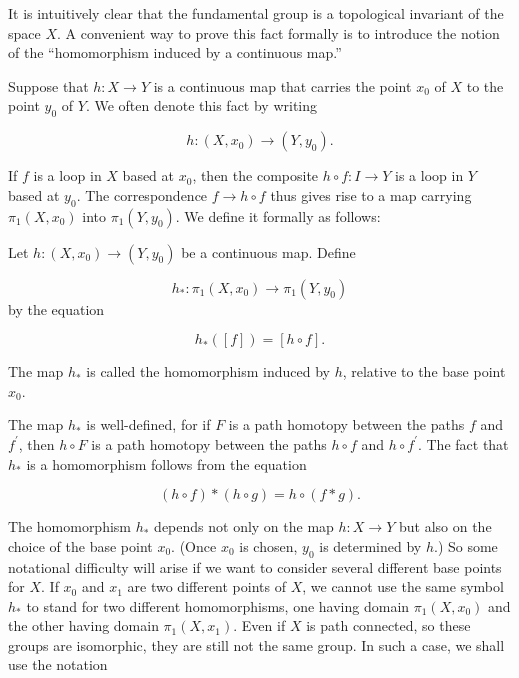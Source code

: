 It is intuitively clear that the fundamental group is a topological invariant of the space \(X\). A convenient way to prove this fact formally is to introduce the notion of the ``homomorphism induced by a continuous map.''

Suppose that \(h : X \rightarrow Y\) is a continuous map that carries the point \(x_{0}\) of \(X\) to the point \(y_{0}\) of \(Y\). We often denote this fact by writing

\[
h : ( {X,x_{0}}) \rightarrow ( {Y,y_{0}}).
\]

If \(f\) is a loop in \(X\) based at \(x_{0}\), then the composite \(h \circ f : I \rightarrow Y\) is a loop in \(Y\) based at \(y_{0}\). The correspondence \(f \rightarrow h \circ f\) thus gives rise to a map carrying \({\pi }_{1}( {X,x_{0}})\) into \({\pi }_{1}( {Y,y_{0}})\). We define it formally as follows:

\begin{definition}
Let \(h : ( {X,x_{0}}) \rightarrow ( {Y,y_{0}})\) be a continuous map. Define

\[
 h_{ * } : {\pi }_{1}( {X,x_{0}}) \rightarrow {\pi }_{1}( {Y,y_{0}})
\]
by the equation

\[
h_{ * }( [ f] ) = [ {h \circ f}] \text{.}
\]

The map \(h_{ * }\) is called the homomorphism induced by \(h\), relative to the base point \(x_{0}\).
\end{definition}

The map \(h_{ * }\) is well-defined, for if \(F\) is a path homotopy between the paths \(f\) and \(f^{\prime }\), then \(h \circ F\) is a path homotopy between the paths \(h \circ f\) and \(h \circ {f}^{\prime }\). The fact that \(h_{ * }\) is a homomorphism follows from the equation

\[
( {h \circ f}) * ( {h \circ g}) = h \circ ( {f * g}).
\]

The homomorphism \(h_{ * }\) depends not only on the map \(h : X \rightarrow Y\) but also on the choice of the base point \(x_{0}\). (Once \(x_{0}\) is chosen, \(y_{0}\) is determined by \(h\).) So some notational difficulty will arise if we want to consider several different base points for \(X\). If \(x_{0}\) and \(x_{1}\) are two different points of \(X\), we cannot use the same symbol \(h_{ * }\) to stand for two different homomorphisms, one having domain \({\pi }_{1}( {X,x_{0}})\) and the other having domain \({\pi }_{1}( {X,x_{1}})\). Even if \(X\) is path connected, so these groups are isomorphic, they are still not the same group. In such a case, we shall use the notation

